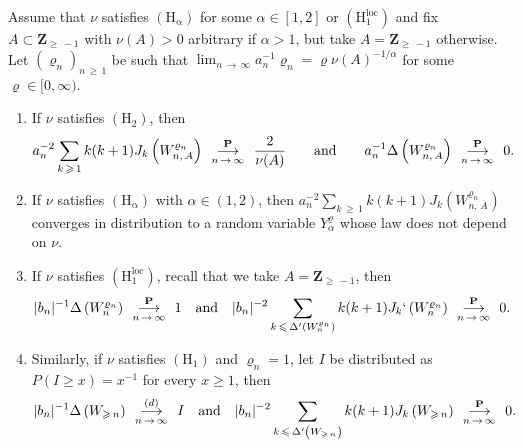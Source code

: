 \documentclass[AHL,Unicode,longabstracts,published]{cedram}
\newcommand{\ensembles}[1]{\mathbf{#1}}
\newcommand{\Z}{\ensembles{Z}}
\renewcommand{\P}{\ensembles{P}}
\newcommand{\1}{\ensembles{1}}
\renewcommand{\le}{\leqslant}
\renewcommand{\ge}{\geqslant}
\newcommand{\Hrm}{\mathrm{H}}
\newcommand{\Hrmloc}{\mathrm{(H_1^{loc})}}
\newcommand{\Hrmalp}{\mathrm{(H_\alpha)}}
\newcommand{\cvloi}[1][n]{\enskip\mathop{\longrightarrow}^{(d)}_{#1\,\to\, \infty}\enskip}
\newcommand{\cvproba}[1][n]{\enskip\mathop{\longrightarrow}^{\P}_{#1\,\to\, \infty}\enskip}
\begin{document}
\begin{theo}\label{thm:GW}
Assume that $\nu$ satisfies $\Hrmalp$ for some $\alpha \in [1, 2]$ or $\Hrmloc$ and fix $A \subset \Z_{\ge\,-1}$ with $\nu(A) > 0$ arbitrary if $\alpha>1$, but take $A = \Z_{\ge\,-1}$ otherwise. Let $(\varrho_n)_{n\,\ge\,1}$ be such that $\lim_{n\,\to\,\infty} a_n^{-1} \varrho_n = \varrho \nu(A)^{-1/\alpha}$ for some $\varrho \in [0, \infty)$.
\begin{enumerate}
\item\label{thm:GW_Gaussien}
If $\nu$ satisfies $(\Hrm_2)$, then
\[
a_n^{-2} \sum_{k\,\ge\,1} k (k+1) J_k\left(W^{\varrho_n}_{n,\,A}\right) \cvproba \frac{2}{\nu(A)}
\qquad\text{and}\qquad a_n^{-1} \Delta\left(W^{\varrho_n}_{n,\,A}\right) \cvproba 0.
\]

\item\label{thm:GW_stable}
If $\nu$ satisfies $\Hrmalp$ with $\alpha \in (1,2)$, then $a_n^{-2} \sum_{k\,\ge\,1} k (k+1) J_k(W^{\varrho_n}_{n,\,A})$ converges in distribution to a random variable $Y_\alpha^\varrho$ whose law does not depend on $\nu$.

\item\label{thm:GW_Cauchy_loc}
If $\nu$ satisfies $\Hrmloc$, recall that we take $A = \Z_{\ge\,-1}$, then
\[
|b_n|^{-1} \Delta\left(W^{\varrho_n}_n\right) \cvproba 1
\quad\text{and}\quad |b_n|^{-2} \sum_{k\,\le\, \Delta'\left(W^{\varrho_n}_n\right)} k (k+1) J_k`\left(W^{\varrho_n}_n\right) \cvproba 0.
\]

\item\label{thm:GW_Cauchy_gen}
Similarly, if $\nu$ satisfies $(\Hrm_1)$ and $\varrho_n = 1$, let $I$ be distributed as $P(I \ge x) = x^{-1}$ for every $x \ge 1$, then
\[
|b_n|^{-1} \Delta\left(W_{\ge\,n}\right) \cvloi I
\quad\text{and}\quad |b_n|^{-2} \sum_{k\,\le\, \Delta'\left(W_{\ge\,n}\right)} k (k+1) J_k\left(W_{\ge\,n}\right) \cvproba 0.
\]
\end{enumerate}
\end{theo}
\end{document}
